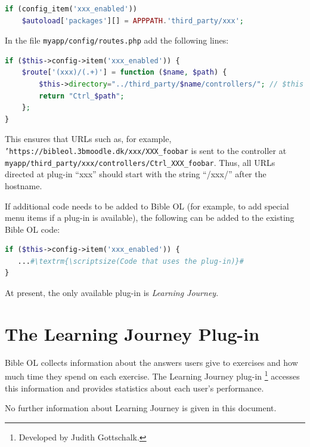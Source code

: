 \documentclass[11pt,oneside,a4paper]{memoir}
\begin{document}
\begin{lstlisting}[language=PHP]
if (config_item('xxx_enabled'))
    $autoload['packages'][] = APPPATH.'third_party/xxx';
\end{lstlisting}

In the file \texttt{myapp/config/routes.php} add the following lines:

\begin{lstlisting}[language=PHP]
if ($this->config->item('xxx_enabled')) {
    $route['(xxx)/(.+)'] = function ($name, $path) {
        $this->directory="../third_party/$name/controllers/"; // $this is the CI_Router object
        return "Ctrl_$path";
    };
}
\end{lstlisting}

This ensures that URLs such as, for example, \texttt{'https://bibleol.3bmoodle.dk/xxx/XXX\_foobar} is
sent to the controller at \texttt{myapp/third\_party/xxx/controllers/Ctrl\_XXX\_foobar}. Thus, all
URLs directed at plug-in ``xxx'' should start with the string ``/xxx/'' after the hostname.

If additional code needs to be added to Bible OL (for example, to add special menu items if a plug-in
is available), the following can be added to the existing Bible OL code:

\begin{lstlisting}[escapechar=\#,language=PHP]
if ($this->config->item('xxx_enabled')) {
   ...#\textrm{\scriptsize(Code that uses the plug-in)}#
}
\end{lstlisting}


At present, the only available plug-in is \emph{Learning Journey}. 

\section{The Learning Journey Plug-in}\label{sec-lj}

Bible OL collects information about the answers users give to exercises and how much time they spend
on each exercise. The Learning Journey plug-in%
\footnote{Developed by Judith Gottschalk.}
accesses this information and provides statistics about each user's
performance.

No further information about Learning Journey is given in this document.




\end{document}
